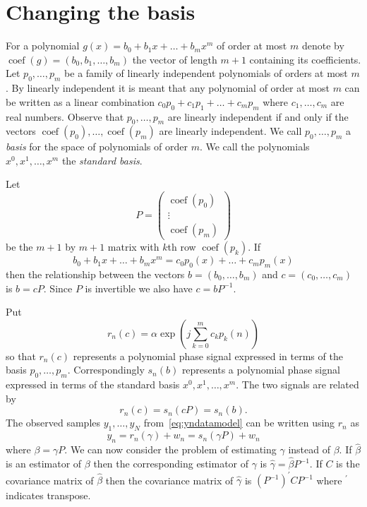 \documentclass[review]{elsarticle}
\newcommand{\coef}{\operatorname{coef}}
\begin{document}
\section{Changing the basis}\label{sec:changing-basis}

\newcommand{\calP}{{\mathcal P}}

For a polynomial $g(x) = b_0 + b_1 x + \dots + b_m x^m$ of order at most $m$ denote by $\coef(g) = (b_0, b_1, \dots, b_m)$ the vector of length $m+1$ containing its coefficients.  Let $p_0,\dots, p_m$ be a family of linearly independent polynomials of orders at most $m$.  By linearly independent it is meant that any polynomial of order at most $m$ can be written as a linear combination $c_0p_0 + c_1 p_1 + \dots + c_m p_m$ where $c_1, \dots, c_m$ are real numbers.  Observe that $p_0, \dots, p_m$ are linearly independent if and only if the vectors $\coef(p_0), \dots, \coef(p_m)$ are linearly independent.  We call $p_0, \dots, p_m$ a \emph{basis} for the space of polynomials of order $m$.  We call the polynomials $x^0, x^1, \dots, x^m$ the \emph{standard basis}.  

Let 
\[
P = \left( \begin{array}{c}
\coef(p_0) \\
\vdots \\
\coef(p_m)
\end{array} \right)
\] 
be the $m+1$ by $m+1$ matrix with $k$th row $\coef(p_k)$.  If
\[
b_0 + b_1 x + \dots + b_m x^m = c_0 p_0(x) + \dots + c_m p_m(x)
\]
then the relationship between the vectors $b =  (b_0, \dots, b_m)$ and $c =  (c_0, \dots, c_m)$ is $b = cP$.  Since $P$ is invertible we also have $c = bP^{-1}$.

Put
\[
r_n(c) = \alpha \exp\left( j \sum_{k = 0}^{m}{c_k p_k(n)}\right)
\]
so that $r_n(c)$ represents a polynomial phase signal expressed in terms of the basis $p_0, \dots, p_m$.  Correspondingly $s_n(b)$ represents a polynomial phase signal expressed in terms of the standard basis $x^0, x^1, \dots, x^m$.  The two signals are related by
\[
r_n(c) = s_n(cP) = s_n(b).
\]
The observed samples $y_1,\dots,y_N$ from~\eqref{eq:yndatamodel} can be written using $r_n$ as
\[
y_n = r_n(\gamma) + w_n = s_n(\gamma P) + w_n
\]
where $\beta = \gamma P$.  We can now consider the problem of estimating $\gamma$ instead of $\beta$.  If $\hat{\beta}$ is an estimator of $\beta$ then the corresponding estimator of $\gamma$ is $\hat{\gamma} = \hat{\beta}P^{-1}$.  If $C$ is the covariance matrix of $\hat{\beta}$ then the covariance matrix of $\hat{\gamma}$ is $(P^{-1})^\prime C P^{-1}$ where $^\prime$ indicates transpose.
\end{document}
